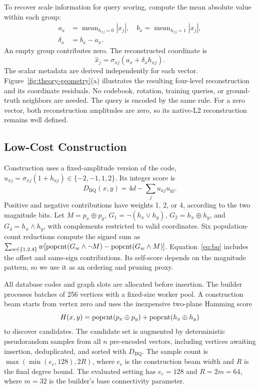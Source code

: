 To recover scale information for query scoring, compute the mean absolute value within each group:
\begin{equation}
\begin{split}
 a_x&=\operatorname{mean}_{h_{xj}=0}|x_j|,
 \quad b_x=\operatorname{mean}_{h_{xj}=1}|x_j|,\\
 \delta_x&=b_x-a_x.
\end{split}
\end{equation}
An empty group contributes zero. The reconstructed coordinate is
\begin{equation}
    \widehat{x}_j=\sigma_{xj}(a_x+\delta_x h_{xj}).
    \label{eq:reconstruction}
\end{equation}
The scalar metadata are derived independently for each vector. Figure~\ref{fig:theory-geometry}(a) illustrates the resulting four-level reconstruction and its coordinate residuals. No codebook, rotation, training queries, or ground-truth neighbors are needed. The query is encoded by the same rule. For a zero vector, both reconstruction amplitudes are zero, so its native-L2 reconstruction remains well defined.

\subsection{Low-Cost Construction}
\label{sec:build}
Construction uses a fixed-amplitude version of the code,
$u_{xj}=\sigma_{xj}(1+h_{xj})\in\{-2,-1,1,2\}$. Its integer score is
\begin{equation}
    D_{\mathrm{BQ}}(x,y)=4d-\sum_j u_{xj}u_{yj}.
    \label{eq:bq}
\end{equation}
Positive and negative contributions have weights 1, 2, or 4, according to the two magnitude bits. Let $M=p_x\oplus p_y$, $G_1=\neg(h_x\lor h_y)$, $G_2=h_x\oplus h_y$, and $G_4=h_x\land h_y$, with complements restricted to valid coordinates. Six population-count reductions compute the signed sum as $\sum_{w\in\{1,2,4\}}w[\operatorname{popcnt}(G_w\land\neg M)-\operatorname{popcnt}(G_w\land M)]$. Equation~\eqref{eq:bq} includes the offset and same-sign contributions. Its self-score depends on the magnitude pattern, so we use it as an ordering and pruning proxy.

All database codes and graph slots are allocated before insertion. The builder processes batches of 256 vertices with a fixed-size worker pool. A construction beam starts from vertex zero and uses the inexpensive two-plane Hamming score
\begin{equation}
 H(x,y)=\operatorname{popcnt}(p_x\oplus p_y)+\operatorname{popcnt}(h_x\oplus h_y)
\end{equation}
to discover candidates. The candidate set is augmented by deterministic pseudorandom samples from all $n$ pre-encoded vectors, including vertices awaiting insertion, deduplicated, and sorted with $D_{\mathrm{BQ}}$. The sample count is
$\max(\min(e_c,128),2R)$, where $e_c$ is the construction beam width and $R$ is the final degree bound. The evaluated setting has $e_c=128$ and $R=2m=64$, where $m=32$ is the builder's base connectivity parameter.


